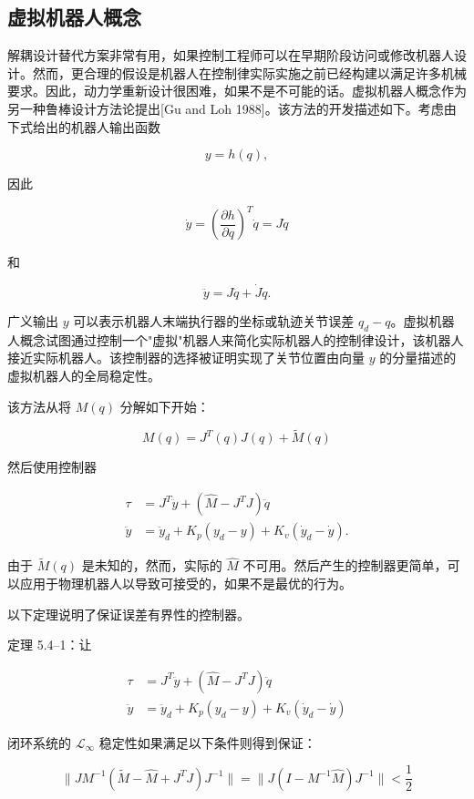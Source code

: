 \documentclass[UTF8,12pt,a4paper]{ctexart}
\begin{document}
\subsection{虚拟机器人概念}

解耦设计替代方案非常有用，如果控制工程师可以在早期阶段访问或修改机器人设计。然而，更合理的假设是机器人在控制律实际实施之前已经构建以满足许多机械要求。因此，动力学重新设计很困难，如果不是不可能的话。虚拟机器人概念作为另一种鲁棒设计方法论提出[Gu and Loh 1988]。该方法的开发描述如下。考虑由下式给出的机器人输出函数

\begin{equation}
y = h(q), \label{eq:5.4.1}
\end{equation}

因此

\begin{equation}
\dot{y} = \left(\frac{\partial h}{\partial q}\right)^T \dot{q} = J\dot{q} \label{eq:5.4.2}
\end{equation}

和

\begin{equation}
\ddot{y} = J\ddot{q} + \dot{J}\dot{q}. \label{eq:5.4.3}
\end{equation}

广义输出 $y$ 可以表示机器人末端执行器的坐标或轨迹关节误差 $q_d - q$。虚拟机器人概念试图通过控制一个"虚拟"机器人来简化实际机器人的控制律设计，该机器人接近实际机器人。该控制器的选择被证明实现了关节位置由向量 $y$ 的分量描述的虚拟机器人的全局稳定性。

该方法从将 $M(q)$ 分解如下开始：

\begin{equation}\label{eq:5.4.4}
M(q) = J^T(q)J(q) + \tilde{M}(q)
\end{equation}

然后使用控制器

\begin{align}
\tau &= J^T \ddot{y} + (\hat{M} - J^T J)\ddot{q} \label{eq:5.4.5} \\
\ddot{y} &= \ddot{y}_d + K_p(y_d - y) + K_v(\dot{y}_d - \dot{y}). \label{eq:5.4.6}
\end{align}

由于 $\tilde{M}(q)$ 是未知的，然而，实际的 $\hat{M}$ 不可用。然后产生的控制器更简单，可以应用于物理机器人以导致可接受的，如果不是最优的行为。

以下定理说明了保证误差有界性的控制器。

\begin{theorem}\label{thm:5.4.1}
定理 5.4--1：让

\begin{align}
\tau &= J^T \ddot{y} + (\hat{M} - J^T J) \ddot{q} \\
\ddot{y} &= \ddot{y}_d + K_p (y_d - y) + K_v (\dot{y}_d - \dot{y})
\end{align}

闭环系统的 $\mathcal{L}_\infty$ 稳定性如果满足以下条件则得到保证：

\begin{equation}
\|JM^{-1}(\tilde{M} - \hat{M} + J^T J)J^{-1}\| = \|J(I - M^{-1}\hat{M})J^{-1}\| < \frac{1}{2}
\end{equation}
\end{theorem}
\end{document}
